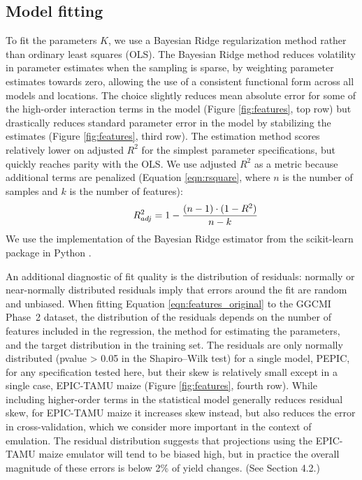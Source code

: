 \documentclass[gmdd]{copernicus} %
\begin{document}
\subsection{Model fitting}
To fit the parameters $K$, we use a Bayesian Ridge regularization method \citep{MacKay91} rather than ordinary least squares (OLS). 
The Bayesian Ridge method reduces volatility in parameter estimates when the sampling is sparse, by weighting parameter estimates towards zero, allowing the use of a consistent functional form across all models and locations. 
The choice slightly reduces mean absolute error for some of the high-order interaction terms in the model (Figure \ref{fig:features}, top row) but drastically reduces standard parameter error in the model by stabilizing the estimates (Figure \ref{fig:features}, third row).
The estimation method scores relatively lower on adjusted $R^2$ for the simplest parameter specifications, but quickly reaches parity with the OLS. 
We use adjusted $R^2$ as a metric because additional terms are penalized (Equation \ref{eqn:rsquare}, where $n$ is the number of samples and $k$ is the number of features): 
\begin{equation}
    \centering
    \label{eqn:rsquare}
        \hspace{10mm} R^{2}_{adj} = 1 - \frac{(n-1) \cdot (1 - R^{2})}{n - k}
\end{equation}
We use the implementation of the Bayesian Ridge estimator from the scikit-learn package in Python \citep{scikit-learn}. 

An additional diagnostic of fit quality is the distribution of residuals: normally or near-normally distributed residuals imply that errors around the fit are random and unbiased. 
When fitting Equation \ref{eqn:features_original} to the GGCMI Phase~2 dataset, the distribution of the residuals depends on the number of features included in the regression, the method for estimating the parameters, and the target distribution in the training set. The residuals are only normally distributed (pvalue > 0.05 in the Shapiro–Wilk test) for a single model, PEPIC, for any specification tested here, but their skew is relatively small except in a single case, EPIC-TAMU maize (Figure \ref{fig:features}, fourth row).
While including higher-order terms in the statistical model generally reduces residual skew, for EPIC-TAMU maize it increases skew instead, but also reduces the error in cross-validation, which we consider more important in the context of emulation.
The residual distribution suggests that projections using the EPIC-TAMU maize emulator will tend to be biased high, but in practice the overall magnitude of these errors is below 2\% of yield changes. (See Section 4.2.)
\end{document}
